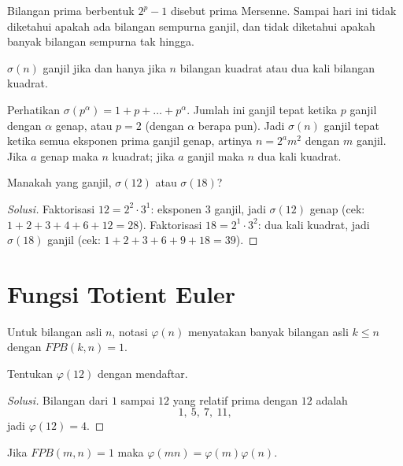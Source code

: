 \documentclass[12pt]{scrartcl}
\begin{document}
\begin{remark}
Bilangan prima berbentuk $2^p - 1$ disebut prima Mersenne.
Sampai hari ini tidak diketahui apakah ada bilangan sempurna ganjil,
dan tidak diketahui apakah banyak bilangan sempurna tak hingga.
\end{remark}

\begin{fact}
$\sigma(n)$ ganjil jika dan hanya jika $n$ bilangan kuadrat
atau dua kali bilangan kuadrat.
\end{fact}

Perhatikan $\sigma(p^\alpha) = 1 + p + \dots + p^\alpha$.
Jumlah ini ganjil tepat ketika $p$ ganjil dengan $\alpha$ genap,
atau $p = 2$ (dengan $\alpha$ berapa pun).
Jadi $\sigma(n)$ ganjil tepat ketika semua eksponen prima ganjil genap,
artinya $n = 2^a m^2$ dengan $m$ ganjil.
Jika $a$ genap maka $n$ kuadrat; jika $a$ ganjil maka $n$ dua kali kuadrat.

\begin{example}
Manakah yang ganjil, $\sigma(12)$ atau $\sigma(18)$?
\end{example}
\begin{proof}[Solusi]
Faktorisasi $12 = 2^2 \cdot 3^1$: eksponen $3$ ganjil, jadi $\sigma(12)$ genap
(cek: $1 + 2 + 3 + 4 + 6 + 12 = 28$).
Faktorisasi $18 = 2^1 \cdot 3^2$: dua kali kuadrat, jadi $\sigma(18)$ ganjil
(cek: $1 + 2 + 3 + 6 + 9 + 18 = 39$).
\end{proof}

\section{Fungsi Totient Euler}

\begin{definition}
Untuk bilangan asli $n$, notasi $\varphi(n)$ menyatakan banyak bilangan asli
$k \le n$ dengan $FPB(k, n) = 1$.
\end{definition}

\begin{example}
Tentukan $\varphi(12)$ dengan mendaftar.
\end{example}
\begin{proof}[Solusi]
Bilangan dari $1$ sampai $12$ yang relatif prima dengan $12$ adalah
\[ 1,\ 5,\ 7,\ 11, \]
jadi $\varphi(12) = 4$.
\end{proof}

\begin{theorem}
Jika $FPB(m, n) = 1$ maka $\varphi(mn) = \varphi(m)\varphi(n)$.
\end{theorem}
\end{document}
